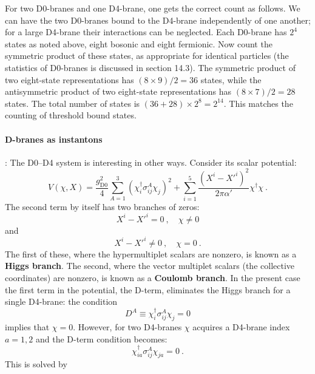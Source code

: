 For two D0-branes and one D4-brane, one gets the correct count as follows. We can have the two D0-branes bound to the D4-brane independently of one another; for a large D4-brane their interactions can be neglected. Each D0-brane has $2^4$ states as noted above, eight bosonic and eight fermionic. Now count the symmetric product of these states, as appropriate for identical particles (the statistics of D0-branes is discussed in section 14.3). The symmetric product of two eight-state representations has $(8 \times 9)/2 = 36$ states, while the antisymmetric product of two eight-state representations has $(8 \times 7)/2 = 28$ states. The total number of states is $(36 + 28) \times 2^8 = 2^{14}$. This matches the counting of threshold bound states.

\paragraph*{D-branes as instantons}:
The D0--D4 system is interesting in other ways. Consider its scalar potential:
\begin{equation}
	V(\chi, X) = \frac{g_{\mathrm{D}0}^2}{4}\sum_{A=1}^3(\chi_i^\dagger\sigma_{ij}^A\chi_j)^2 + \sum_{i=1}^5\frac{(X^i - X'^i)^2}{2\pi\alpha'}\chi^\dagger\chi \:. \label{13.6.25}
\end{equation}
The second term by itself has two branches of zeros:
\begin{equation}
	X^i - X'^i = 0 \:, \quad \chi \neq 0 \label{13.6.26}
\end{equation}
and
\begin{equation}
	X^i - X'^i \neq 0 \:, \quad \chi = 0 \:. \label{13.6.27}
\end{equation}
The first of these, where the hypermultiplet scalars are nonzero, is known as a \textbf{Higgs branch}. The second, where the vector multiplet scalars (the collective coordinates) are nonzero, is known as a \textbf{Coulomb branch}. In the present case the first term in the potential, the D-term, eliminates the Higgs branch for a single D4-brane: the condition
\begin{equation}
	D^A \equiv \chi_i^\dagger\sigma_{ij}^A\chi_j = 0 \label{13.6.28}
\end{equation}
implies that $\chi = 0$. However, for two D4-branes $\chi$ acquires a D4-brane index $a = 1, 2$ and the D-term condition becomes:
\begin{equation}
	\chi_{ia}^\dagger\sigma_{ij}^A\chi_{ja} = 0 \:. \label{13.6.29}
\end{equation}
This is solved by
